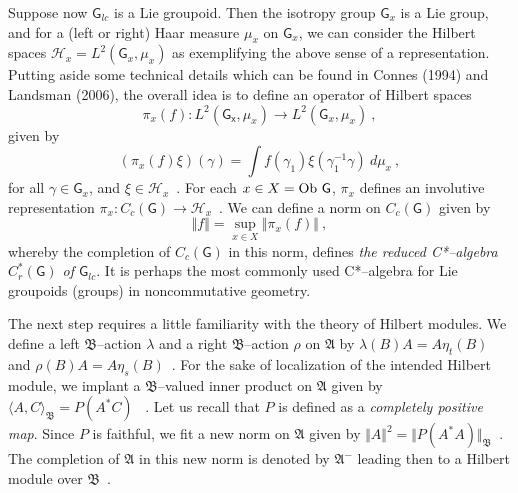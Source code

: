 \documentclass[12pt]{article}
\theoremstyle{plain}
\theoremstyle{definition}
\numberwithin{equation}{section}
\newcommand{\ob}{{\rm Ob}}
\newcommand{\lra}{{\longrightarrow}}
\begin{document}
 Suppose now $\mathsf{G}_{lc}$ is a Lie groupoid. Then the isotropy group
$\mathsf{G}_x$ is a Lie group, and for a (left or right) Haar
measure $\mu_x$ on $\mathsf{G}_x$, we can consider the Hilbert
spaces $\mathcal H_x = L^2(\mathsf{G}_x, \mu_x)$ as exemplifying the
above sense of a representation. Putting aside some technical
details which can be found in Connes (1994) and Landsman (2006), the
overall idea is to define an operator of Hilbert spaces
\begin{equation}\pi_x(f) : L^2(\mathsf{G_x},\mu_x) \lra L^2(\mathsf{G}_x, \mu_x)~,
\end{equation}
given by
\begin{equation}
(\pi_x(f) \xi)(\gamma) = \int f(\gamma_1) \xi (\gamma_1^{-1}
\gamma)~ d\mu_x~,
\end{equation}
for all $\gamma \in \mathsf{G}_x$, and
$\xi \in \mathcal H_x$~. For each $x \in X =\ob ~\mathsf{G}$, $\pi_x$
defines an involutive representation $\pi_x : C_c(\mathsf{G}) \lra
\mathcal H_x$~. We can define a norm on $C_c(\mathsf{G})$ given by
\begin{equation}
\Vert f \Vert = \sup_{x \in X} \Vert \pi_x(f) \Vert~,
\end{equation}
whereby the completion of $C_c(\mathsf{G})$ in this norm, defines
\emph{the reduced C*--algebra $C^*_r(\mathsf{G})$ of $\mathsf{G}_{lc}$}. It is
perhaps the most commonly used C*--algebra for Lie groupoids
(groups) in noncommutative geometry.

The next step requires a little familiarity with the theory of
Hilbert modules. We define a left
$\mathfrak B$--action $\lambda$ and a right $\mathfrak B$--action
$\rho$ on $\mathfrak A$ by $\lambda(B)A = A \eta_t (B)$ and
$\rho(B)A = A \eta_s(B)$~. For the sake of localization of the
intended Hilbert module, we implant a $\mathfrak B$--valued inner
product on $\mathfrak A$ given by $\langle A, C \rangle_{\mathfrak
B} = P(A^* C)$ ~. Let us recall that $P$ is defined as a \emph{completely positive map}.
Since $P$ is faithful, we fit a new norm on $\mathfrak A$ given by $\Vert A \Vert^2 = \Vert P(A^* A)
\Vert_{\mathfrak B}$~. The completion of $\mathfrak A$ in this new
norm is denoted by $\mathfrak A^{-}$ leading then to a Hilbert
module over $\mathfrak B$~.
\end{document}
